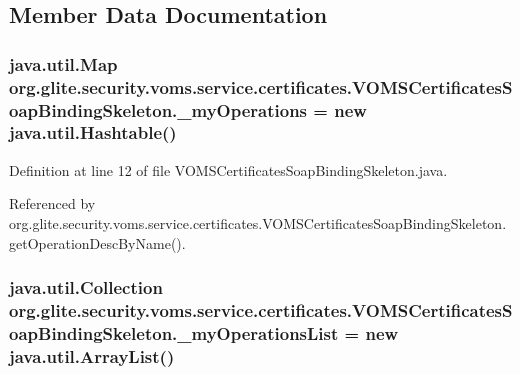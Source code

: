 \subsection{Member Data Documentation}
\hypertarget{classorg_1_1glite_1_1security_1_1voms_1_1service_1_1certificates_1_1VOMSCertificatesSoapBindingSkeleton_af84bddc4a9a5ffc869b7b4b7083b2baa}{
\subsubsection[{\_\-myOperations}]{\setlength{\rightskip}{0pt plus 5cm}java.util.Map {\bf org.glite.security.voms.service.certificates.VOMSCertificatesSoapBindingSkeleton.\_\-myOperations} = new java.util.Hashtable()}}
\label{classorg_1_1glite_1_1security_1_1voms_1_1service_1_1certificates_1_1VOMSCertificatesSoapBindingSkeleton_af84bddc4a9a5ffc869b7b4b7083b2baa}


Definition at line 12 of file VOMSCertificatesSoapBindingSkeleton.java.



Referenced by org.glite.security.voms.service.certificates.VOMSCertificatesSoapBindingSkeleton.getOperationDescByName().

\hypertarget{classorg_1_1glite_1_1security_1_1voms_1_1service_1_1certificates_1_1VOMSCertificatesSoapBindingSkeleton_ae9461020ed1f45e7dafed3a3f830f283}{
\subsubsection[{\_\-myOperationsList}]{\setlength{\rightskip}{0pt plus 5cm}java.util.Collection {\bf org.glite.security.voms.service.certificates.VOMSCertificatesSoapBindingSkeleton.\_\-myOperationsList} = new java.util.ArrayList()}}
\label{classorg_1_1glite_1_1security_1_1voms_1_1service_1_1certificates_1_1VOMSCertificatesSoapBindingSkeleton_ae9461020ed1f45e7dafed3a3f830f283}


